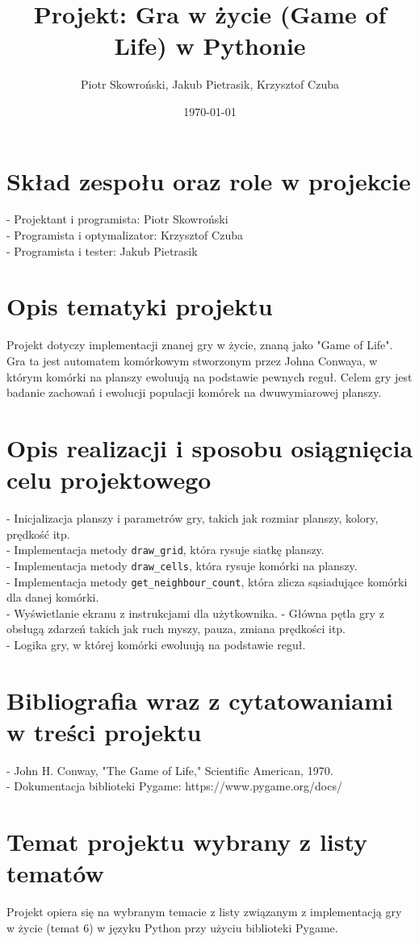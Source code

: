 \documentclass[12pt]{article}
\title{Projekt: Gra w życie (Game of Life) w Pythonie}
\author{Piotr Skowroński, Jakub Pietrasik, Krzysztof Czuba}
\date{\today}
\begin{document}
\maketitle

\section{Skład zespołu oraz role w projekcie}
   - Projektant i programista: Piotr Skowroński\\
   - Programista i optymalizator: Krzysztof Czuba\\
   - Programista i tester: Jakub Pietrasik

\section{Opis tematyki projektu}
   Projekt dotyczy implementacji znanej gry w życie, znaną jako "Game of Life". Gra ta jest automatem komórkowym stworzonym przez Johna Conwaya, w którym komórki na planszy ewoluują na podstawie pewnych reguł. Celem gry jest badanie zachowań i ewolucji populacji komórek na dwuwymiarowej planszy.

\section{Opis realizacji i sposobu osiągnięcia celu projektowego}
   - Inicjalizacja planszy i parametrów gry, takich jak rozmiar planszy, kolory, prędkość itp.\\
   - Implementacja metody \texttt{draw\_grid}, która rysuje siatkę planszy.\\
   - Implementacja metody \texttt{draw\_cells}, która rysuje komórki na planszy.\\
   - Implementacja metody \texttt{get\_neighbour\_count}, która zlicza sąsiadujące komórki dla danej komórki.\\
   - Wyświetlanie ekranu z instrukcjami dla użytkownika.
   - Główna pętla gry z obsługą zdarzeń takich jak ruch myszy, pauza, zmiana prędkości itp.\\
   - Logika gry, w której komórki ewoluują na podstawie reguł.

\section{Bibliografia wraz z cytatowaniami w treści projektu}
   - John H. Conway, "The Game of Life," Scientific American, 1970.\\
   - Dokumentacja biblioteki Pygame: https://www.pygame.org/docs/

\section{Temat projektu wybrany z listy tematów}
   Projekt opiera się na wybranym temacie z listy związanym z implementacją gry w życie (temat 6) w języku Python przy użyciu biblioteki Pygame.
\end{document}
